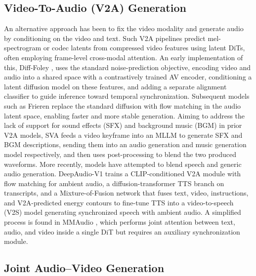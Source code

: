 \documentclass{article} %
\begin{document}
\subsection{Video-To-Audio (V2A) Generation}
An alternative approach has been to fix the video modality and generate audio by conditioning on the video and text. Such V2A pipelines predict mel-spectrogram or codec latents from compressed video features using latent DiTs, often employing frame-level cross-modal attention. An early implementation of this, Diff-Foley \citep{luo2023diff}, uses the standard noise-prediction objective, encoding video and audio into a shared space with a contrastively trained AV encoder, conditioning a latent diffusion model on these features, and adding a separate alignment classifier to guide inference toward temporal synchronization. Subsequent models such as Frieren \citep{wang2024frieren} replace the standard diffusion with flow matching in the audio latent space, enabling faster and more stable generation. Aiming to address the lack of support for sound effects (SFX) and background music (BGM) in prior V2A models, SVA \citep{chen2024semantically} feeds a video keyframe into an MLLM to generate SFX and BGM descriptions, sending them into an audio generation and music generation model respectively, and then uses post-processing to blend the two produced waveforms. More recently, models have attempted to blend speech and generic audio generation. DeepAudio-V1 \citep{zhang2025deepaudio} trains a CLIP-conditioned V2A module with flow matching for ambient audio, a diffusion-transformer TTS branch on transcripts, and a Mixture-of-Fusion network that fuses text, video, instructions, and V2A-predicted energy contours to fine-tune TTS into a video-to-speech (V2S) model generating synchronized speech with ambient audio. A simplified process is found in MMAudio \citep{cheng2025mmaudio}, which performs joint attention between text, audio, and video inside a single DiT but requires an auxiliary synchronization module. 


\subsection{Joint Audio–Video Generation}
\end{document}

